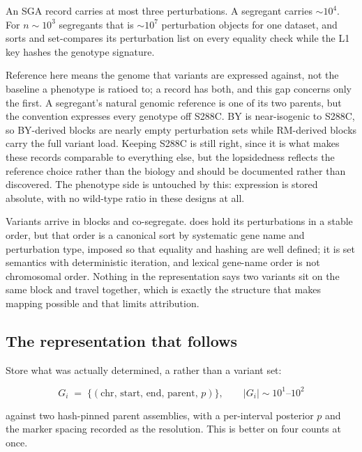  An SGA record carries at most three perturbations. A segregant carries
$\sim\!10^4$. For $n \sim 10^3$ segregants that is $\sim\!10^7$ perturbation objects for one
dataset, and  sorts and set-compares its perturbation list on every equality
check while the L1 key hashes the genotype signature.

 Reference here means the genome that variants are expressed
against, not the baseline a phenotype is ratioed to; a record has both, and this gap
concerns only the first. A segregant's natural genomic reference is one of its two
parents, but the convention expresses every genotype off S288C. BY is near-isogenic to
S288C, so BY-derived blocks are nearly empty perturbation sets while RM-derived blocks
carry the full variant load. Keeping S288C is still right, since it is what makes these
records comparable to everything else, but the lopsidedness reflects the reference choice
rather than the biology and should be documented rather than discovered. The phenotype
side is untouched by this: expression is stored absolute, with no wild-type ratio in
these designs at all.

 Variants arrive in blocks and co-segregate.
 does hold its perturbations in a stable order, but that order is a
canonical sort by systematic gene name and perturbation type, imposed so that equality
and hashing are well defined; it is set semantics with deterministic iteration, and
lexical gene-name order is not chromosomal order. Nothing in the representation says two
variants sit on the same block and travel together, which is exactly the structure that
makes mapping possible and that limits attribution.

\subsection{The representation that follows}\label{sec:proposal}

Store what was actually determined, a  rather than a variant set:

$$
G_i \;=\; \big\{ (\text{chr},\, \text{start},\, \text{end},\, \text{parent},\, p) \big\},
\qquad |G_i| \sim 10^1\text{--}10^2
$$

against two hash-pinned parent assemblies, with a per-interval posterior $p$ and the marker
spacing recorded as the resolution. This is better on four counts at once.

